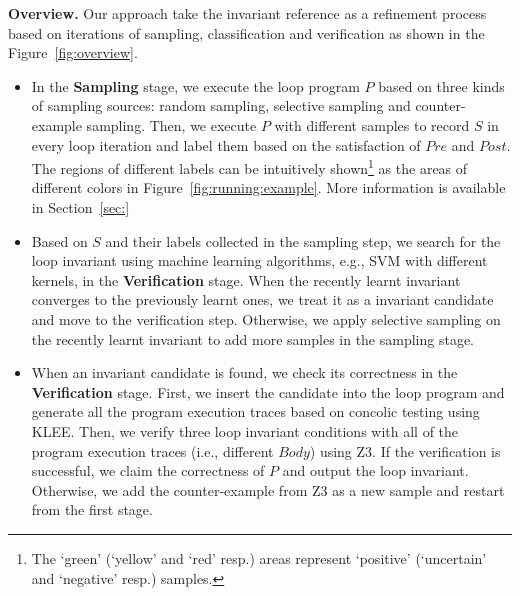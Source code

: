 \medskip\noindent
\textbf{Overview.}
Our approach take the invariant reference as a refinement process 
based on iterations of sampling, classification and verification 
as shown in the Figure~\ref{fig:overview}. 
\begin{itemize}
    \item 
    In the \textbf{Sampling} stage, 
    we execute the loop program $P$ based on three kinds of sampling sources: 
    random sampling, selective sampling and counter-example sampling. 
    Then, we execute $P$ with different samples to record $S$ in every loop iteration 
    and label them based on the satisfaction of $\mathit{Pre}$ and $\mathit{Post}$. 
    The regions of different labels can be intuitively shown\footnote{
        The `green' (`yellow' and `red' resp.) areas 
        represent `positive' (`uncertain' and `negative' resp.) samples. 
    } as the areas of different colors in Figure~\ref{fig:running:example}. 
    More information is available in Section~\ref{sec:}
    \item 
    Based on $S$ and their labels collected in the sampling step, 
    we search for the loop invariant using machine learning algorithms, 
    e.g., SVM with different kernels, in the \textbf{Verification} stage. 
    When the recently learnt invariant converges to the previously learnt ones, 
    we treat it as a invariant candidate and move to the verification step. 
    Otherwise, we apply selective sampling on the recently learnt invariant 
    to add more samples in the sampling stage. 
    \item 
    When an invariant candidate is found, 
    we check its correctness in the \textbf{Verification} stage. 
    First, we insert the candidate into the loop program and generate all the program execution traces 
    based on concolic testing using KLEE. 
    Then, we verify three loop invariant conditions 
    with all of the program execution traces (i.e., different $\mathit{Body}$) using Z3. 
    If the verification is successful, we claim the correctness of $P$ and output the loop invariant. 
    Otherwise, we add the counter-example from Z3 as a new sample 
    and restart from the first stage. 
\end{itemize}

